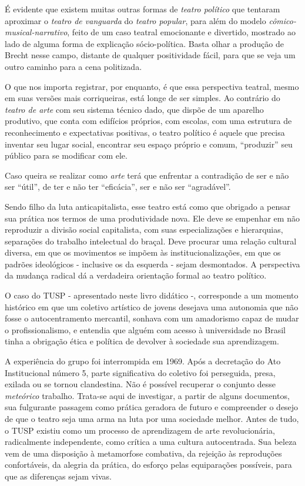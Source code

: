 É evidente que existem muitas outras formas de \textit{teatro político} que
tentaram aproximar o \textit{teatro de vanguarda} do \textit{teatro popular},
para além do modelo \textit{cômico-musical-narrativo}, feito de um caso
teatral emocionante e divertido, mostrado ao lado de alguma forma de
explicação sócio-política. Basta olhar a produção de Brecht nesse campo,
distante de qualquer positividade fácil, para que se veja um outro
caminho para a cena politizada.

O que nos importa registrar, por enquanto, é que essa perspectiva
teatral, mesmo em suas versões mais corriqueiras, está longe de ser
simples. Ao contrário do \textit{teatro de arte} com seu sistema técnico
dado, que dispõe de um aparelho produtivo, que conta com edifícios
próprios, com escolas, com uma estrutura de reconhecimento e
expectativas positivas, o teatro político é aquele que precisa inventar
seu lugar social, encontrar seu espaço próprio e comum, “produzir” seu
público para se modificar com ele.

Caso queira se realizar como \textit{arte} terá que enfrentar a contradição
de ser e não ser “útil”, de ter e não ter “eficácia”, ser e não ser
“agradável”.

Sendo filho da luta anticapitalista, esse teatro está como que obrigado
a pensar sua prática nos termos de uma produtividade nova. Ele deve se
empenhar em não reproduzir a divisão social capitalista, com suas
especializações e hierarquias, separações do trabalho intelectual do
braçal. Deve procurar uma relação cultural diversa, em que os movimentos
se impõem às institucionalizações, em que os padrões ideológicos -
inclusive os da esquerda - sejam desmontados. A perspectiva da mudança
radical dá a verdadeira orientação formal ao teatro político.

O caso do TUSP - apresentado neste livro didático -, corresponde a um
momento histórico em que um coletivo artístico de jovens desejava uma
autonomia que não fosse o autocentramento mercantil, sonhava com um
amadorismo capaz de mudar o profissionalismo, e entendia que alguém com
acesso à universidade no Brasil tinha a obrigação ética e política de
devolver à sociedade sua aprendizagem.

A experiência do grupo foi interrompida em 1969. Após a decretação do
Ato Institucional número 5, parte significativa do coletivo foi
perseguida, presa, exilada ou se tornou clandestina. Não é possível
recuperar o conjunto desse \textit{meteórico} trabalho. Trata-se aqui de
investigar, a partir de alguns documentos, sua fulgurante passagem como
prática geradora de futuro e compreender o desejo de que o teatro seja
uma arma na luta por uma sociedade melhor. Antes de tudo, o TUSP existiu
como um processo de aprendizagem de arte revolucionária, radicalmente
independente, como crítica a uma cultura autocentrada. Sua beleza vem de
uma disposição à metamorfose combativa, da rejeição às reproduções
confortáveis, da alegria da prática, do esforço pelas equiparações
possíveis, para que as diferenças sejam vivas.

